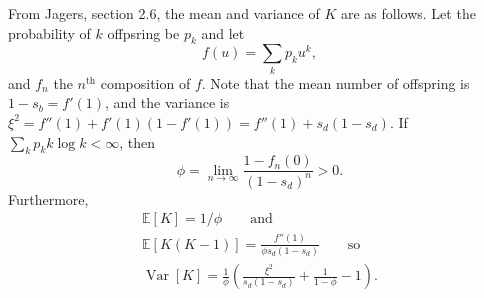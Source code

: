 \documentclass{article}
\newcommand{\E}{\mathbb{E}}
\newcommand{\var}{\mathop{\mbox{Var}}}
\begin{document}
From Jagers, section 2.6,
the mean and variance of $K$ are as follows.
Let the probability of $k$ offpsring be $p_k$ and let
\[
 f(u) =  \sum_k p_k u^k,
\]
and $f_n$ the $n^\mathrm{th}$ composition of $f$.
Note that the mean number of offspring is $1-s_b = f'(1)$, and the variance is $\xi^2 = f''(1) + f'(1)(1-f'(1)) = f''(1) + s_d(1-s_d)$.
If $\sum_k p_k k \log k < \infty$, then 
\[
\phi = \lim_{n \to \infty} \frac{ 1-f_n(0) }{ (1-s_d)^n } > 0 .
\]
Furthermore,
\begin{gather*}
\E[K] = 1/\phi \qquad \mbox{and} \\
\E[K(K-1)] = \frac{ f''(1) }{ \phi s_d (1-s_d) } \qquad \mbox{so} \\
\var[K] = \frac{1}{\phi} \left( \frac{ \xi^2 }{ s_d (1-s_d) } + \frac{1}{1-\phi} - 1 \right) .
\end{gather*}
\end{document}
